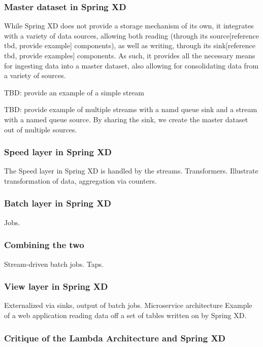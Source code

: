 \subsubsection {Master dataset in Spring XD}

While Spring XD does not provide a storage mechanism of its own, it integrates with a variety of data sources, allowing both reading (through its source[reference tbd, provide example] components), as well as writing, through its sink[reference tbd, provide examples] components. As such, it provides all the necessary means for ingesting data into a master dataset, also allowing for consolidating data from a variety of sources. 

TBD: provide an example of a simple stream

TBD: provide example of multiple streams with a namd queue sink and a stream with a named queue source. By sharing the sink, we create the master dataset out of multiple sources.

\subsubsection {Speed layer in Spring XD}

The Speed layer in Spring XD is handled by the streams. Transformers. Illustrate transformation of data, aggregation via counters.  

\subsubsection {Batch layer in Spring XD}

Jobs.

\subsubsection {Combining the two}

Stream-driven batch jobs. Taps. 

\subsubsection {View layer in Spring XD}

Externalized via sinks, output of batch jobs. Microservice architecture Example of a web application reading data off a set of tables written on by Spring XD. 

\subsubsection {Critique of the Lambda Architecture and Spring XD}

